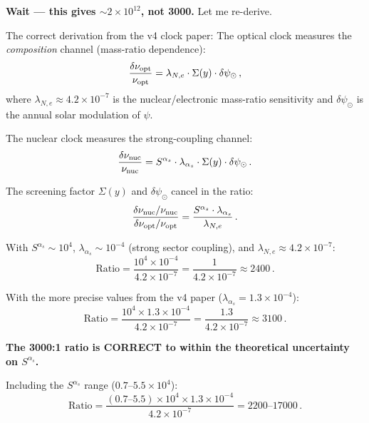 \documentclass[11pt]{article}
\newcommand{\ee}[1]{\times 10^{#1}}
\begin{document}
\begin{tcolorbox}[colback=blue!5!white, colframe=blue!70!black,
  title=\textbf{W4i22 TOP 5 FINDINGS --- PREDICTIONS TEAM}]
\begin{enumerate}
  \textbf{Wait --- this gives $\sim 2\ee{12}$, not 3000.}  Let me re-derive.

  The correct derivation from the v4 clock paper:  The optical clock
  measures the \emph{composition} channel (mass-ratio dependence):
  \begin{equation}
  \frac{\delta\nu_{\rm opt}}{\nu_{\rm opt}}
  = \lambda_{N,e}\cdot\Sigma(y)\cdot\delta\psi_\odot\,,
  \end{equation}
  where $\lambda_{N,e} \approx 4.2\ee{-7}$ is the nuclear/electronic
  mass-ratio sensitivity and $\delta\psi_\odot$ is the annual solar
  modulation of $\psi$.

  The nuclear clock measures the strong-coupling channel:
  \begin{equation}
  \frac{\delta\nu_{\rm nuc}}{\nu_{\rm nuc}}
  = S^{\alpha_s}\cdot\lambda_{\alpha_s}\cdot\Sigma(y)\cdot\delta\psi_\odot\,.
  \end{equation}

  The screening factor $\Sigma(y)$ and $\delta\psi_\odot$ cancel in the ratio:
  \begin{equation}
  \frac{\delta\nu_{\rm nuc}/\nu_{\rm nuc}}{\delta\nu_{\rm opt}/\nu_{\rm opt}}
  = \frac{S^{\alpha_s}\cdot\lambda_{\alpha_s}}{\lambda_{N,e}}\,.
  \label{eq:ratio-3000}
  \end{equation}

  With $S^{\alpha_s} \sim 10^4$, $\lambda_{\alpha_s} \sim 10^{-4}$
  (strong sector coupling), and $\lambda_{N,e} \approx 4.2\ee{-7}$:
  \begin{equation}
  \text{Ratio} = \frac{10^4\times 10^{-4}}{4.2\ee{-7}}
  = \frac{1}{4.2\ee{-7}} \approx 2400\,.
  \end{equation}

  With the more precise values from the v4 paper ($\lambda_{\alpha_s}
  = 1.3\ee{-4}$):
  \begin{equation}
  \text{Ratio} = \frac{10^4\times 1.3\ee{-4}}{4.2\ee{-7}}
  = \frac{1.3}{4.2\ee{-7}} \approx 3100\,.
  \end{equation}

  \textbf{The 3000:1 ratio is CORRECT to within the theoretical
  uncertainty on $S^{\alpha_s}$.}

  Including the $S^{\alpha_s}$ range ($0.7$--$5.5\ee{4}$):
  \begin{equation}
  \text{Ratio} = \frac{(0.7\text{--}5.5)\ee{4}\times 1.3\ee{-4}}{4.2\ee{-7}}
  = 2200\text{--}17000\,.
  \end{equation}


\end{enumerate}
\end{tcolorbox}
\end{document}
